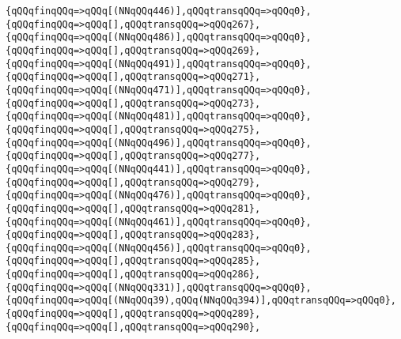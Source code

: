 \verb|{qQQqfinqQQq=>qQQq[(NNqQQq446)],qQQqtransqQQq=>qQQq0},|\newline
\verb|{qQQqfinqQQq=>qQQq[],qQQqtransqQQq=>qQQq267},|\newline
\verb|{qQQqfinqQQq=>qQQq[(NNqQQq486)],qQQqtransqQQq=>qQQq0},|\newline
\verb|{qQQqfinqQQq=>qQQq[],qQQqtransqQQq=>qQQq269},|\newline
\verb|{qQQqfinqQQq=>qQQq[(NNqQQq491)],qQQqtransqQQq=>qQQq0},|\newline
\verb|{qQQqfinqQQq=>qQQq[],qQQqtransqQQq=>qQQq271},|\newline
\verb|{qQQqfinqQQq=>qQQq[(NNqQQq471)],qQQqtransqQQq=>qQQq0},|\newline
\verb|{qQQqfinqQQq=>qQQq[],qQQqtransqQQq=>qQQq273},|\newline
\verb|{qQQqfinqQQq=>qQQq[(NNqQQq481)],qQQqtransqQQq=>qQQq0},|\newline
\verb|{qQQqfinqQQq=>qQQq[],qQQqtransqQQq=>qQQq275},|\newline
\verb|{qQQqfinqQQq=>qQQq[(NNqQQq496)],qQQqtransqQQq=>qQQq0},|\newline
\verb|{qQQqfinqQQq=>qQQq[],qQQqtransqQQq=>qQQq277},|\newline
\verb|{qQQqfinqQQq=>qQQq[(NNqQQq441)],qQQqtransqQQq=>qQQq0},|\newline
\verb|{qQQqfinqQQq=>qQQq[],qQQqtransqQQq=>qQQq279},|\newline
\verb|{qQQqfinqQQq=>qQQq[(NNqQQq476)],qQQqtransqQQq=>qQQq0},|\newline
\verb|{qQQqfinqQQq=>qQQq[],qQQqtransqQQq=>qQQq281},|\newline
\verb|{qQQqfinqQQq=>qQQq[(NNqQQq461)],qQQqtransqQQq=>qQQq0},|\newline
\verb|{qQQqfinqQQq=>qQQq[],qQQqtransqQQq=>qQQq283},|\newline
\verb|{qQQqfinqQQq=>qQQq[(NNqQQq456)],qQQqtransqQQq=>qQQq0},|\newline
\verb|{qQQqfinqQQq=>qQQq[],qQQqtransqQQq=>qQQq285},|\newline
\verb|{qQQqfinqQQq=>qQQq[],qQQqtransqQQq=>qQQq286},|\newline
\verb|{qQQqfinqQQq=>qQQq[(NNqQQq331)],qQQqtransqQQq=>qQQq0},|\newline
\verb|{qQQqfinqQQq=>qQQq[(NNqQQq39),qQQq(NNqQQq394)],qQQqtransqQQq=>qQQq0},|\newline
\verb|{qQQqfinqQQq=>qQQq[],qQQqtransqQQq=>qQQq289},|\newline
\verb|{qQQqfinqQQq=>qQQq[],qQQqtransqQQq=>qQQq290},|\newline
